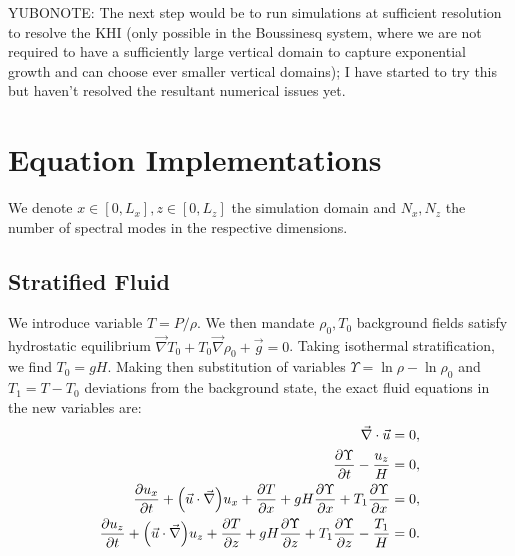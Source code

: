\documentclass[twocolumn,
        usenames, %
        dvipsnames %
    ]{revtex4-1}%
\newcommand*{\pd}[2]{\frac{\partial#1}{\partial#2}}
\DeclarePairedDelimiter\p{\lparen}{\rparen}
\begin{document}
YUBONOTE\@: The next step would be to run simulations at sufficient resolution to
resolve the KHI (only possible in the Boussinesq system, where we are not
required to have a sufficiently large vertical domain to capture exponential
growth and can choose ever smaller vertical domains); I have started to try this
but haven't resolved the resultant numerical issues yet.

\clearpage
\onecolumngrid
\appendix

\section{Equation Implementations}

We denote $x \in [0, L_x], z \in [0, L_z]$ the simulation domain and $N_x, N_z$
the number of spectral modes in the respective dimensions.

\subsection{Stratified Fluid}\label{ss:strat_impl}

We introduce variable $T = P/\rho$. We then mandate $\rho_0, T_0$ background
fields satisfy hydrostatic equilibrium $\vec{\nabla}T_0 + T_0 \vec{\nabla}\rho_0
+ \vec{g} = 0$. Taking isothermal stratification, we find $T_0 = gH$. Making
then substitution of variables $\Upsilon = \ln \rho - \ln \rho_0$ and $T_1 = T -
T_0$ deviations from the background state, the exact fluid equations in the new
variables are:
\begin{subequations}\label{se:fc_var}
    \begin{align}
        \vec{\nabla} \cdot \vec{u} &= 0,\\
        \pd{\Upsilon}{t} - \frac{u_z}{H} &= 0,\\
        \pd{u_x}{t} + \p*{\vec{u} \cdot \vec{\nabla}}u_x
            + \pd{T}{x} + gH\pd{\Upsilon}{x}
            + T_1 \pd{\Upsilon}{x} &= 0,\\
        \pd{u_z}{t} + \p*{\vec{u} \cdot \vec{\nabla}}u_z
            + \pd{T}{z} + gH\pd{\Upsilon}{z}
            + T_1 \pd{\Upsilon}{z} - \frac{T_1}{H} &= 0.
    \end{align}
\end{subequations}
\end{document}
